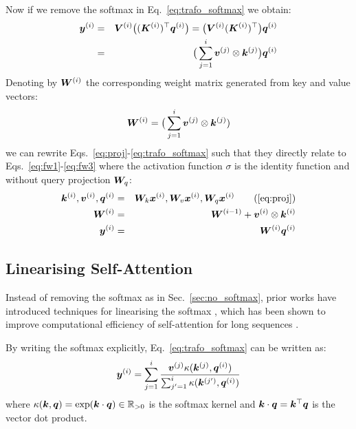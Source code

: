 \documentclass{article}
\theoremstyle{definition}
\begin{document}
Now if we remove the softmax in Eq.~\ref{eq:trafo_softmax} we obtain:
\begin{eqnarray}
{\bm{y}}^{(i)} &=& {\bm{V}}^{(i)} \big(({\bm{K}}^{(i)})^{\top} {\bm{q}}^{(i)}\big) = \big({\bm{V}}^{(i)} ({\bm{K}}^{(i)})^{\top}\big) {\bm{q}}^{(i)} \nonumber \\
&=& \big(\sum_{j=1}^{i} {\bm{v}}^{(j)} \otimes {\bm{k}}^{(j)}\big) {\bm{q}}^{(i)}
\end{eqnarray}
Denoting by ${\bm{W}}^{(i)}$ the corresponding weight matrix generated from key
and value vectors:
\begin{eqnarray}
{\bm{W}}^{(i)} = \big(\sum_{j=1}^{i} {\bm{v}}^{(j)}  \otimes {\bm{k}}^{(j)} )
\end{eqnarray}
we can rewrite Eqs.~\ref{eq:proj}-\ref{eq:trafo_softmax}
such that they directly relate to Eqs.~\ref{eq:fw1}-\ref{eq:fw3} where the activation function
$\sigma$ is the identity function and without query projection ${\bm{W}}_q$:
\begin{eqnarray}
\vk^{(i)}, \vv^{(i)}, \vq^{(i)} &=& \mW_k \vx^{(i)}, \mW_v \vx^{(i)}, \mW_q \vx^{(i)} \tag{\ref{eq:proj}} \\
\mW^{(i)}  &=& \mW^{(i-1)} + \vv^{(i)}  \otimes \vk^{(i)} \label{eq:fw_add} \\
\vy^{(i)}  &=& \mW^{(i)} \vq^{(i)} \label{eq:fw_get}
\end{eqnarray}

\subsection{Linearising Self-Attention}
\label{sec:linearAttention}
Instead of removing the softmax as in Sec.~\ref{sec:no_softmax},
prior works have introduced techniques for linearising the softmax \citep{tsai2019},
which has been shown to improve computational efficiency of self-attention for long sequences \citep{katharopoulos2020transformers, choromanski2020rethinking, peng2021random}.

By writing the softmax explicitly, Eq.~\ref{eq:trafo_softmax} can be written as:
\begin{align}
    \label{eq:softmax}
    {\bm{y}}^{(i)} = \sum_{j=1}^i \frac{
         {\bm{v}}^{(j)}  \kappa({\bm{k}}^{(j)}, {\bm{q}}^{(i)})
         }{
         \sum_{j'=1}^i \kappa({\bm{k}}^{(j')}, {\bm{q}}^{(i)})
         }
\end{align}
where $\kappa({\bm{k}}, {\bm{q}}) = \exp({\bm{k}} \cdot {\bm{q}}) \in \mathbb{R}_{>0}$ is the softmax kernel
and ${\bm{k}} \cdot {\bm{q}} = {\bm{k}}^{\top}{\bm{q}}$ is the vector dot product.
\end{document}
